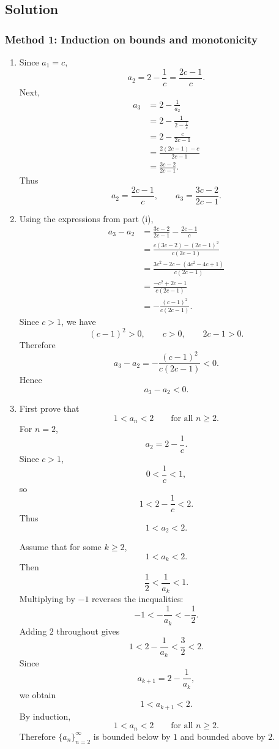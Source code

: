 \documentclass[12pt]{article}
\begin{document}
\bigskip
\subsection{Solution}

\subsubsection{Method 1: Induction on bounds and monotonicity}

\begin{enumerate}[label=(\roman*)]
\item Since $a_1=c$,
\[
a_2=2-\frac1c=\frac{2c-1}{c}.
\]
Next,
\begin{align*}
a_3
&=2-\frac1{a_2}\\
&=2-\frac1{2-\frac1c}\\
&=2-\frac{c}{2c-1}\\
&=\frac{2(2c-1)-c}{2c-1}\\
&=\frac{3c-2}{2c-1}.
\end{align*}
Thus
\[
\boxed{a_2=\frac{2c-1}{c},\qquad a_3=\frac{3c-2}{2c-1}.}
\]

\item Using the expressions from part (i),
\begin{align*}
a_3-a_2
&=
\frac{3c-2}{2c-1}-\frac{2c-1}{c}\\
&=
\frac{c(3c-2)-(2c-1)^2}{c(2c-1)}\\
&=
\frac{3c^2-2c-(4c^2-4c+1)}{c(2c-1)}\\
&=
\frac{-c^2+2c-1}{c(2c-1)}\\
&=
-\frac{(c-1)^2}{c(2c-1)}.
\end{align*}
Since $c>1$, we have
\[
(c-1)^2>0,\qquad c>0,\qquad 2c-1>0.
\]
Therefore
\[
a_3-a_2=-\frac{(c-1)^2}{c(2c-1)}<0.
\]
Hence
\[
\boxed{a_3-a_2<0.}
\]

\item First prove that
\[
1<a_n<2
\qquad\text{for all }n\ge 2.
\]
For $n=2$,
\[
a_2=2-\frac1c.
\]
Since $c>1$,
\[
0<\frac1c<1,
\]
so
\[
1<2-\frac1c<2.
\]
Thus
\[
1<a_2<2.
\]

Assume that for some $k\ge 2$,
\[
1<a_k<2.
\]
Then
\[
\frac12<\frac1{a_k}<1.
\]
Multiplying by $-1$ reverses the inequalities:
\[
-1<-\frac1{a_k}<-\frac12.
\]
Adding $2$ throughout gives
\[
1<2-\frac1{a_k}<\frac32<2.
\]
Since
\[
a_{k+1}=2-\frac1{a_k},
\]
we obtain
\[
1<a_{k+1}<2.
\]
By induction,
\[
1<a_n<2
\qquad\text{for all }n\ge 2.
\]
Therefore $\{a_n\}_{n=2}^{\infty}$ is bounded below by $1$ and bounded above by $2$.


\end{enumerate}
\end{document}
